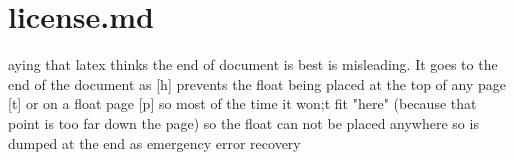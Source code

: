 \section{license.md}

aying that latex thinks the end of document is best is misleading. It goes to the end of the document as [h] prevents the float being placed at the top of any page [t] or on a float page [p] so most of the time it won;t fit "here" (because that point is too far down the page) so the float can not be placed anywhere so is dumped at the end as emergency error recovery
